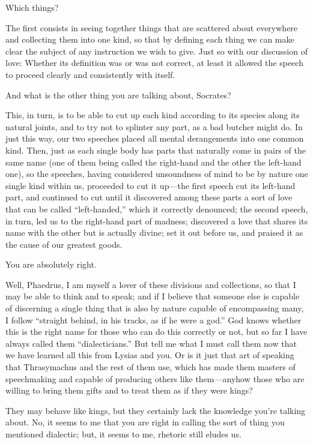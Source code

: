 \sayphaedrus Which things?

\saysocrates The first consists in seeing together things that are
scattered about everywhere and collecting them into one kind, so that by
defining each thing we can make clear the subject of any instruction we
wish to give. Just so with our discussion of love: Whether its
definition was or was not correct, at least it allowed the speech to
proceed clearly and consistently with itself.

\sayphaedrus And what is the other thing you are talking about, Socrates?

\saysocrates This, in turn, is to be able to cut up each kind
according to its species along its natural joints, and to try not to
splinter any part, as a bad butcher might do. In just this way, our two
speeches placed all mental derangements into one common
kind. Then, just as each single body has parts that naturally come in
pairs of the same name (one of them being called the right-hand and the
other the left-hand one), so the speeches, having considered unsoundness
of mind to be by nature one single kind within us, proceeded to cut it
up---the first speech cut its left-hand part, and continued to cut until
it discovered among these parts a sort of love that can be called
“left-handed,” which it correctly denounced; the second speech, in turn,
led us to the right-hand part of madness; discovered a love that shares
its name with the other but is actually divine; set it out 
before us, and praised it as the cause of our greatest goods.

\sayphaedrus You are absolutely right.

\saysocrates Well, Phaedrus, I am myself a lover of these divisions and
collections, so that I may be able to think and to speak; and if I
believe that someone else is capable of discerning a single thing that
is also by nature capable of encompassing
many, I follow
“straight behind, in his tracks, as if he were a
god.” God knows
whether this is the right name for those who can do this correctly or
not, but so far I have always called them “dialecticians.” But
tell me what I must call them now that we have learned all this from
Lysias and you. Or is it just that art of speaking that Thrasymachus and
the rest of them use, which has made them masters of speechmaking and
capable of producing others like them---anyhow those who are willing to
bring them gifts and to treat them as if they were kings?

\sayphaedrus They may behave like kings, but they certainly lack the
knowledge you’re talking about. No, it seems to me that you are right in
calling the sort of thing you mentioned dialectic; but, it seems to me,
rhetoric still eludes us.

